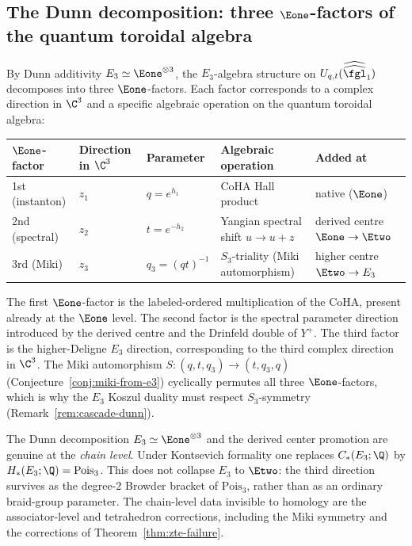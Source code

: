 \subsection{The Dunn decomposition: three \texorpdfstring{$\Eone$}{E1}-factors of the quantum toroidal algebra}
\label{subsec:dunn-three-factors}

By Dunn additivity \(E_3\simeq \Eone^{\otimes 3}\), the
$E_3$-algebra structure on
$U_{q,t}(\widehat{\widehat{\fgl}}_1)$ decomposes into three
$\Eone$-factors. Each factor corresponds to a complex direction in
$\C^3$ and a specific algebraic operation on the quantum toroidal
algebra:

\begin{center}
\renewcommand{\arraystretch}{1.3}
\small
\begin{tabular}{lllll}
 \toprule
 $\Eone$-factor & Direction in $\C^3$ & Parameter & Algebraic operation & Added at \\
 \midrule
 1st (instanton) & $z_1$ & $q = e^{h_1}$ & CoHA Hall product & native ($\Eone$) \\
 2nd (spectral) & $z_2$ & $t = e^{-h_2}$ & Yangian spectral shift $u \to u + z$ & derived centre \(\Eone \to \Etwo\) \\
 3rd (Miki) & $z_3$ & $q_3 = (qt)^{-1}$ & $S_3$-triality (Miki automorphism) & higher centre \(\Etwo \to E_3\) \\
 \bottomrule
\end{tabular}
\end{center}

\noindent The first $\Eone$-factor is the labeled-ordered multiplication of the CoHA, present already at the $\Eone$ level. The second factor is the spectral parameter direction introduced by the derived centre and the Drinfeld double of $Y^+$. The third factor is the higher-Deligne \(E_3\) direction, corresponding to the third complex direction in $\C^3$. The Miki automorphism $S\colon (q, t, q_3) \to (t, q_3, q)$ (Conjecture~\ref{conj:miki-from-e3}) cyclically permutes all three $\Eone$-factors, which is why the $E_3$ Koszul duality must respect $S_3$-symmetry (Remark~\ref{rem:cascade-dunn}).

\begin{remark}
\label{rem:higher-deligne-chain-rational}
The Dunn decomposition $E_3 \simeq \Eone^{\otimes 3}$ and the derived center promotion are genuine at the \emph{chain level}. Under Kontsevich formality one replaces \(C_*(E_3;\Q)\) by \(H_*(E_3;\Q)=\mathrm{Pois}_3\). This does not collapse \(E_3\) to \(\Etwo\): the third direction survives as the degree-\(2\) Browder bracket of \(\mathrm{Pois}_3\), rather than as an ordinary braid-group parameter. The chain-level data invisible to homology are the associator-level and tetrahedron corrections, including the Miki symmetry and the corrections of Theorem~\ref{thm:zte-failure}.
\end{remark}


